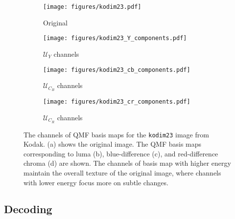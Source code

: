 \begin{figure*}[!t]
    \centering
    \begin{minipage}{0.22\textwidth}
        \centering
        \begin{subfigure}{\textwidth}
            \centering
            \texttt{[image: figures/kodim23.pdf]}
            \caption{Original}
        \end{subfigure}
    \end{minipage}%
    \begin{minipage}{0.40\textwidth}
        \centering
        \begin{subfigure}{\textwidth}
            \centering
            \texttt{[image: figures/kodim23\_Y\_components.pdf]}
            \vspace{-10pt}
            \caption{$\bm{\mathcal{U}}_Y$ channels}
        \end{subfigure}
    \end{minipage}%
    \begin{minipage}{0.32\textwidth}
        \centering
        \begin{subfigure}{\textwidth}
            \centering
            \texttt{[image: figures/kodim23\_cb\_components.pdf]}
            \vspace{-10pt}
            \caption{$\bm{\mathcal{U}}_{C_B}$ channels}
        \end{subfigure}
        \begin{subfigure}{\textwidth}
            \centering
            \texttt{[image: figures/kodim23\_cr\_components.pdf]}
            \vspace{-10pt}
            \caption{$\bm{\mathcal{U}}_{C_R}$ channels}
        \end{subfigure}
    \end{minipage}
    \caption{The channels of QMF basis maps for the \texttt{kodim23} image from Kodak. (a) shows the original image. The QMF basis maps corresponding to luma (b), blue-difference (c), and red-difference chroma (d) are shown. The channels of basis map with higher energy maintain the overall texture of the original image, where channels with lower energy focus more on subtle changes.}
    \label{fig:qmf_components}
\end{figure*}


\subsection{Decoding} \label{sec:decoding}


